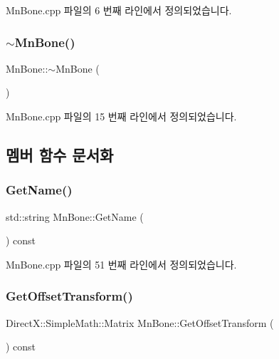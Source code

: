 Mn\+Bone.\+cpp 파일의 6 번째 라인에서 정의되었습니다.

\mbox{\label{class_m_n_l_1_1_mn_bone_a56cefd0c1acf49770e49748fe2a3a51d}} 
\subsubsection{\texorpdfstring{$\sim$\+Mn\+Bone()}{~MnBone()}}
{\footnotesize\ttfamily Mn\+Bone\+::$\sim$\+Mn\+Bone (\begin{DoxyParamCaption}{ }\end{DoxyParamCaption})}



Mn\+Bone.\+cpp 파일의 15 번째 라인에서 정의되었습니다.



\subsection{멤버 함수 문서화}
\mbox{\label{class_m_n_l_1_1_mn_bone_a7780138cc897c4358c276cbe04c2868c}} 
\subsubsection{\texorpdfstring{Get\+Name()}{GetName()}}
{\footnotesize\ttfamily std\+::string Mn\+Bone\+::\+Get\+Name (\begin{DoxyParamCaption}{ }\end{DoxyParamCaption}) const}



Mn\+Bone.\+cpp 파일의 51 번째 라인에서 정의되었습니다.

\mbox{\label{class_m_n_l_1_1_mn_bone_a30963b69412919ada3ca5f166faf846f}} 
\subsubsection{\texorpdfstring{Get\+Offset\+Transform()}{GetOffsetTransform()}}
{\footnotesize\ttfamily Direct\+X\+::\+Simple\+Math\+::\+Matrix Mn\+Bone\+::\+Get\+Offset\+Transform (\begin{DoxyParamCaption}{ }\end{DoxyParamCaption}) const}



